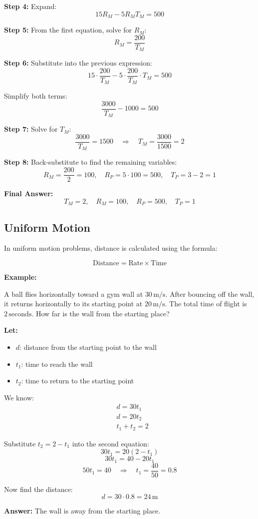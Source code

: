 \documentclass[11pt]{article}
\begin{document}
\textbf{Step 4:} Expand:
\[
15 R_M - 5 R_M T_M = 500
\]

\textbf{Step 5:} From the first equation, solve for \( R_M \):
\[
R_M = \frac{200}{T_M}
\]

\textbf{Step 6:} Substitute into the previous expression:
\[
15 \cdot \frac{200}{T_M} - 5 \cdot \frac{200}{T_M} \cdot T_M = 500
\]

Simplify both terms:
\[
\frac{3000}{T_M} - 1000 = 500
\]

\textbf{Step 7:} Solve for \( T_M \):
\[
\frac{3000}{T_M} = 1500 \quad \Rightarrow \quad T_M = \frac{3000}{1500} = 2
\]

\textbf{Step 8:} Back-substitute to find the remaining variables:
\[
R_M = \frac{200}{2} = 100, \quad R_P = 5 \cdot 100 = 500, \quad T_P = 3 - 2 = 1
\]

\textbf{Final Answer:}
\[
\boxed{
T_M = 2, \quad R_M = 100, \quad R_P = 500, \quad T_P = 1
}
\]

\subsection{Uniform Motion}

In uniform motion problems, distance is calculated using the formula:

\[
\text{Distance} = \text{Rate} \times \text{Time}
\]

\textbf{Example:}

A ball flies horizontally toward a gym wall at \( 30 \, \text{m/s} \). After bouncing off the wall, it returns horizontally to its starting point at \( 20 \, \text{m/s} \). The total time of flight is \( 2 \, \text{seconds} \). How far is the wall from the starting place?

\textbf{Let:}
\begin{itemize}
  \item \( d \): distance from the starting point to the wall
  \item \( t_1 \): time to reach the wall
  \item \( t_2 \): time to return to the starting point
\end{itemize}

We know:
\[
\begin{aligned}
&d = 30t_1 \\
&d = 20t_2 \\
&t_1 + t_2 = 2
\end{aligned}
\]

Substitute \( t_2 = 2 - t_1 \) into the second equation:
\[
30t_1 = 20(2 - t_1)
\]
\[
30t_1 = 40 - 20t_1
\]
\[
50t_1 = 40 \quad \Rightarrow \quad t_1 = \frac{40}{50} = 0.8
\]

Now find the distance:
\[
d = 30 \cdot 0.8 = \boxed{24 \, \text{m}}
\]

\textbf{Answer:} The wall is  away from the starting place.
\end{document}
